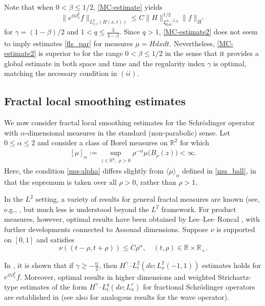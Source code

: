 \documentclass[11pt]{amsart}
\theoremstyle{definition}
\theoremstyle{remark}
\newcommand{\R}{\mathbb{R}}
\newcommand{\inn}[1]{\langle  #1 \rangle}
\begin{document}
Note that when $0< \beta\leq 1/2$, \eqref{MC-estimate} yields 
\begin{equation}\label{MC-estimate2}
   \| e^{it\partial_x^2}f\|_{L_{x,t}^2(H(x,t))} \le C \| H\|_{\mathfrak L_{\text{par}}^{3-\beta,q}}^{1/2}\|f\|_{\dot{H}^\gamma} 
\end{equation}
for $\gamma = (1-\beta)/2$ and $1<q\leq \frac{3}{3-\beta}$.
Since $q>1$, \eqref{MC-estimate2} does not seem to  imply estimates \eqref{fls_par} for measures $\mu=Hdxdt$. Nevertheless, \eqref{MC-estimate2} is superior to  for the  range $0<\beta\leq 1/2$ in the sense that it provides a global estimate in both space and time and the regularity index $\gamma$ is optimal, matching the necessary condition in  $(ii)$.




\subsection{Fractal local smoothing estimates}
We now consider fractal local smoothing estimates for the Schr\"odinger operator with $\alpha$-dimensional measures in the standard (non-parabolic) sense. Let $0\le \alpha \le 2$ and consider a class of Borel measures on $\R^2$ for which 
\begin{align}\label{mu-alpha}
[\mu]_{\alpha} := \sup_{z\in \R^2,\; \rho>0}  \rho^{-\alpha}\mu\big(B_\rho(z)\big) <\infty.
\end{align}
Here, the condition \eqref{mu-alpha} differs slightly from $\inn{\mu}_\alpha$ defined in \eqref{mu_ball}, in that the supremum is taken over all $\rho>0$, rather than $\rho>1$.

In the $L^2$ setting, a variety of results for general fractal measures are known (see, e.g., \cite{Wolff2, Mattila, Oberlin, DuZhang}, but much less is understood beyond the $L^2$ framework.
For product measures, however, optimal results have been obtained by Lee--Lee--Roncal \cite{LLR},
with further developments connected to Assouad dimensions.
Suppose $\nu$ is supported on $[0,1]$ and satisfies
\[
\nu((t-\rho,t+\rho)) \le C\rho^\alpha, \quad (t,\rho)\in \R\times \R_{+}.
\]

In \cite[Theorem 1.6]{LLR}, it is shown that if $\gamma\ge -\frac \alpha 2$, then $H^\gamma$--$L_t^2(d\nu;L_x^2(-1,1))$ estimates holds for $e^{it\partial_x^2} f$.
Moreover, optimal results in higher dimensions and weighted Strichartz-type estimates of the form $H^\gamma$--$L_t^q(d\nu;L_x^r)$ for fractional Schr\"odinger operators are established in \cite{LLR} (see also \cite{BRRS} for analogous results for the wave operator).
\end{document}
